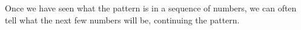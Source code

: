 Once we have seen what the pattern is in a sequence of numbers, we can often 
tell what the next few numbers will be, continuing the pattern.